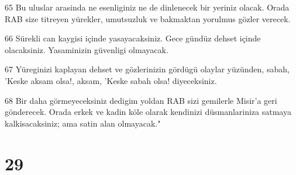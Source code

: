 \par 65 Bu uluslar arasinda ne esenliginiz ne de dinlenecek bir yeriniz olacak. Orada RAB size titreyen yürekler, umutsuzluk ve bakmaktan yorulmus gözler verecek.
\par 66 Sürekli can kaygisi içinde yasayacaksiniz. Gece gündüz dehset içinde olacaksiniz. Yasaminizin güvenligi olmayacak.
\par 67 Yüreginizi kaplayan dehset ve gözlerinizin gördügü olaylar yüzünden, sabah, 'Keske aksam olsa!, aksam, 'Keske sabah olsa! diyeceksiniz.
\par 68 Bir daha görmeyeceksiniz dedigim yoldan RAB sizi gemilerle Misir'a geri gönderecek. Orada erkek ve kadin köle olarak kendinizi düsmanlariniza satmaya kalkisacaksiniz; ama satin alan olmayacak."

\chapter{29}

